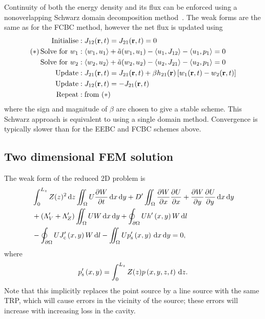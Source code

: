 \documentclass[a4paper]{article}
\numberwithin{equation}{section}
\begin{document}
Continuity of both the energy density and its flux can be enforced using a nonoverlapping Schwarz domain decomposition
method~\citep{Lions1990}. The weak forms are the same as for the FCBC method, however the net flux is updated using
\begin{align}
\mathrm{Initialise} &: J_{12}(\boldsymbol{\mathrm{r}},t) = J_{21}(\boldsymbol{\mathrm{r}},t) = 0 \nonumber \\
\mathrm{(\ast)\,Solve\,\,for}\,\,w_1 &: \langle w_1,u_1 \rangle + \tilde{a}(w_1,u_1) - \langle u_1 , J_{12} \rangle - \langle u_1 , p_1 \rangle = 0 \nonumber \\
\mathrm{Solve\,\,for}\,\,w_2 &: \langle w_2,u_2 \rangle + \tilde{a}(w_2,u_2) - \langle u_2 , J_{21} \rangle - \langle u_2 , p_1 \rangle = 0 \nonumber \\
\mathrm{Update} &: J_{21}(\boldsymbol{\mathrm{r}},t) = J_{21}(\boldsymbol{\mathrm{r}},t) + \beta h_{21}(\boldsymbol{\mathrm{r}}) \left[ w_1(\boldsymbol{\mathrm{r}},t) - w_2(\boldsymbol{\mathrm{r}},t) \right] \nonumber \\
\mathrm{Update} &: J_{12}(\boldsymbol{\mathrm{r}},t) = -J_{21}(\boldsymbol{\mathrm{r}},t) \nonumber \\
\mathrm{Repeat} &: \mathrm{from}\,\,(\ast) \nonumber
\end{align}
where the sign and magnitude of $\beta$ are chosen to give a stable scheme. This Schwarz approach
is equivalent to using a single domain method. Convergence is typically slower than for the 
EEBC and FCBC schemes above.

\subsection[Two dimensional FEM solution]{Two dimensional FEM solution}
\label{sc:fem:2d}

The weak form of the reduced 2D problem is
\begin{align}
&\int_0^{L_z}Z(z)^2\,\mathrm{d}{z}\iint_{\Omega} U\frac{{\partial}W}{{\partial}t}\,\mathrm{d}{x}\,\mathrm{d}{y}
+D^\prime\iint_{\Omega}\frac{{\partial}W}{{\partial}x}\frac{{\partial}U}{{\partial}x}+\frac{{\partial}W}{{\partial}y}\frac{{\partial}U}{{\partial}y}\,\mathrm{d}{x}\,\mathrm{d}{y} \nonumber \\
&+\left(\Lambda_V^\prime+\Lambda_Z^\prime\right)\iint_{\Omega }UW\,\mathrm{d}{x}\,\mathrm{d}{y}
+\oint_{\partial\Omega} Uh^\prime\left(x,y\right)W\,\mathrm{d}{l} \nonumber \\
&-\oint_{\partial\Omega} UJ_{\mathrm{c}}^\prime\left(x,y\right) W\,\mathrm{d}{l}
-\iint_{\Omega} U p_{\mathrm{s}}^\prime\left(x,y\right)\,\mathrm{d}{x}\,\mathrm{d}{y}=0,
\end{align}
where
\begin{align}
p_{\mathrm{s}}^\prime\left(x,y\right)=\int_0^{L_z}Z(z)p\left(x,y,z,t\right)\,\mathrm{d}{z}.
\end{align}
Note that this implicitly replaces the point source by a line source with the same TRP, which 
will cause errors in the vicinity of the source; these errors will increase with increasing
loss in the cavity.
\end{document}
